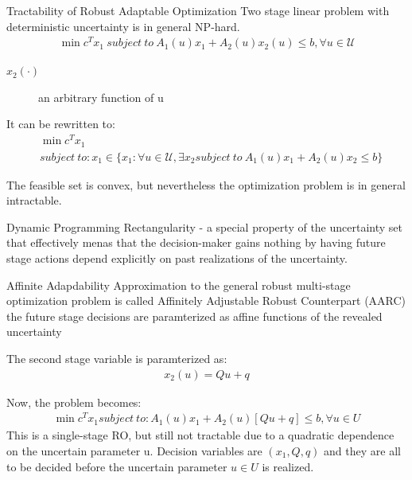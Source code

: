 \documentclass{beamer}
\begin{document}
\begin{frame}{Tractability of Robust Adaptable Optimization}
Two stage linear problem with deterministic uncertainty is in general NP-hard.
\begin{align*}
\min c^{T}x_{1}
~subject~to~A_{1}(u)x_{1} + A_{2}(u)x_{2}(u) \leq b, \forall u \in \mathcal{U}
\end{align*}
\begin{description}
\item [$x_{2}(\cdot)$] an arbitrary function of u
\end{description}
It can be rewritten to:
\begin{align*}
& \min c^{T}x_{1} \\
& subject~to: x_{1} \in \{x_{1} : \forall u \in \mathcal{U}, \exists x_{2} subject~to~ A_{1}(u)x_{1} + A_{2}(u)x_{2} \leq b \}
\end{align*}

The feasible set is convex, but nevertheless the optimization problem is in general intractable.
\end{frame}

\begin{frame}{Dynamic Programming}
Rectangularity - a special property of the uncertainty set that effectively menas that the decision-maker gains nothing by having future stage actions depend explicitly on past realizations of the uncertainty.
\end{frame}

\begin{frame}{Affinite Adapdability}
Approximation to the general robust multi-stage optimization problem is called Affinitely Adjustable Robust Counterpart (AARC)
the future stage decisions are paramterized as affine functions of the revealed uncertainty

The second stage variable is paramterized as:
\begin{align*}
x_{2}(u) = Qu + q
\end{align*}

Now, the problem becomes:
\begin{align*}
\min c^{T}x_{1}
subject~to: A_{1}(u)x_{1} + A_{2}(u)[Qu + q] \leq b, \forall u \in U
\end{align*}
This is a single-stage RO, but still not tractable due to a quadratic dependence on the uncertain parameter u.
Decision variables are $(x_{1}, Q, q)$ and they are all to be decided before the uncertain parameter $u \in U$ is realized.
\end{frame}
\end{document}
